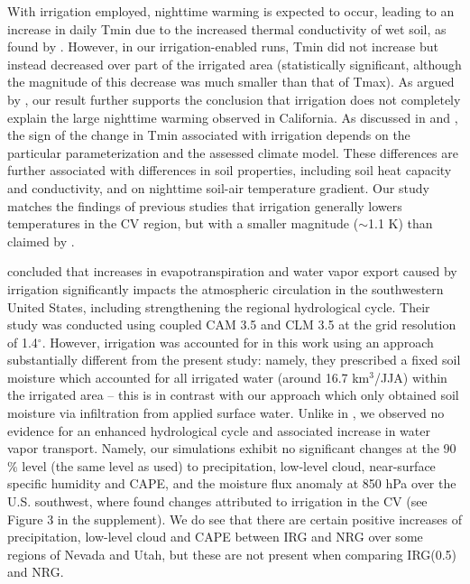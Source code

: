 With irrigation employed, nighttime warming is expected to occur, leading to an increase in daily Tmin due to the increased thermal conductivity of wet soil, as found by \cite{kanamaru2008model}. However, in our irrigation-enabled runs, Tmin did not increase but instead decreased over part of the irrigated area (statistically significant, although the magnitude of this decrease was much smaller than that of Tmax). As argued by \cite{bonfils2007empirical}, our result further supports the conclusion that irrigation does not completely explain the large nighttime warming observed in California. As discussed in \cite{kueppers2008seasonal} and \cite{kanamaru2008model}, the sign of the change in Tmin associated with irrigation depends on the particular parameterization and the assessed climate model.  These differences are further associated with differences in soil properties, including soil heat capacity and conductivity, and on nighttime soil-air temperature gradient. Our study matches the findings of previous studies that irrigation generally lowers temperatures in the CV region, but with a smaller magnitude ($\sim$1.1 K) than claimed by \cite{lobell2006biogeophysical}. 


\cite{lo2013irrigation} concluded that increases in evapotranspiration and water vapor export caused by irrigation significantly impacts the atmospheric circulation in the southwestern United States, including strengthening the regional hydrological cycle.  Their study was conducted using coupled CAM 3.5 and CLM 3.5 at the grid resolution of 1.4$^\circ$. However, irrigation was accounted for in this work using an approach substantially different from the present study: namely, they prescribed a fixed soil moisture which accounted for all irrigated water (around 16.7 km$^3$/JJA) within the irrigated area -- this is in contrast with our approach which only obtained soil moisture via infiltration from applied surface water.  Unlike in \cite{lo2013irrigation}, we observed no evidence for an enhanced hydrological cycle and associated increase in water vapor transport. Namely, our simulations exhibit no significant changes at the 90$\%$ level (the same level as \cite{lo2013irrigation} used) to precipitation, low-level cloud, near-surface specific humidity and CAPE, and the moisture flux anomaly at 850 hPa over the U.S. southwest, where \cite{lo2013irrigation} found changes attributed to irrigation in the CV (see Figure 3 in the supplement). We do see that there are certain positive increases of precipitation, low-level cloud and CAPE between IRG and NRG over some regions of Nevada and Utah, but these are not present when comparing IRG(0.5) and NRG.


